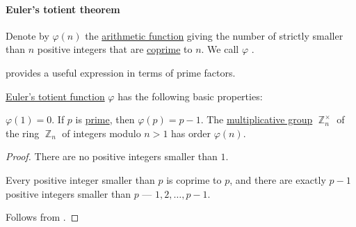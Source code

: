 \paragraph{Euler's totient theorem}

\begin{definition}\label{def:eulers_totient_function}
  Denote by \( \varphi(n) \) the \hyperref[def:arithmetic_function]{arithmetic function} giving the number of strictly smaller than \( n \) positive integers that are \hyperref[def:coprime_elements]{coprime} to \( n \). We call \( \varphi \) .
\end{definition}
\begin{comments}
  \item {} provides a useful expression in terms of prime factors.
\end{comments}

\begin{proposition}\label{thm:def:eulers_totient_function}
  \hyperref[def:eulers_totient_function]{Euler's totient function} \( \varphi \) has the following basic properties:
  \begin{thmenum}
     \( \varphi(1) = 0 \).
     If \( p \) is \hyperref[def:prime_number]{prime}, then \( \varphi(p) = p - 1 \).
     The \hyperref[def:semiring]{multiplicative group} \( \BbbZ_n^\times \) of the ring \hyperref[def:ring_of_integers_modulo]{\( \BbbZ_n \)} of integers modulo \( n > 1 \) has order \( \varphi(n) \).
  \end{thmenum}
\end{proposition}
\begin{proof}
   There are no positive integers smaller than \( 1 \).

   Every positive integer smaller than \( p \) is coprime to \( p \), and there are exactly \( p - 1 \) positive integers smaller than \( p \) --- \( 1, 2, \ldots, p - 1 \).

   Follows from .
\end{proof}

